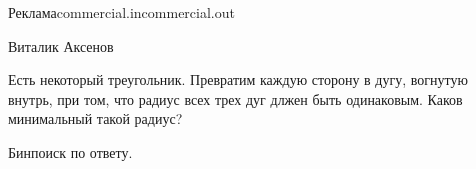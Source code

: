\begin{proposal}{Реклама}{commercial.in}{commercial.out}{}

\Author

Виталик Аксенов

\ProblemIdea
      
Есть некоторый треугольник. Превратим каждую сторону в дугу, вогнутую внутрь, при том, что радиус всех трех дуг длжен быть одинаковым. Каков минимальный такой радиус?

\SolutionIdea

Бинпоиск по ответу.

\ProblemVariations


\ProblemComplexity                              


\WrongSolutions



\end{proposal}
